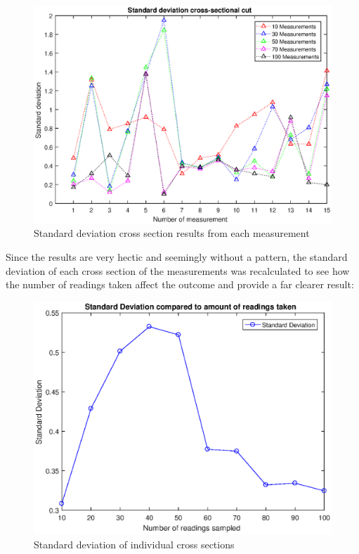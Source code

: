 \documentclass[twoside]{ctuthesis}
\theoremstyle{plain}
\theoremstyle{definition}
\theoremstyle{note}
\begin{document}
\begin{figure}[H]
	\centering
	\includegraphics[width = \textwidth]{stdAcrossAllMeasurements}
	\caption{Standard deviation cross section results from each measurement}
\end{figure}

Since the results are very hectic and seemingly without a pattern, the standard deviation of each cross section of the measurements was recalculated to see how the number of readings taken affect the outcome and provide a far clearer result:

\begin{figure}[H]
	\centering
	\includegraphics[width = \textwidth]{CrossSectionReadingsStd}
	\caption{Standard deviation of individual cross sections}
\end{figure}
\end{document}
